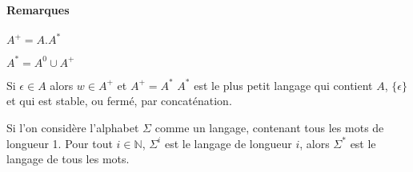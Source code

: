 \paragraph{Remarques} %
\label{par:remarques}

$A^+ = A.A^*$

$A^* = A^0 \cup A^+$

Si $\epsilon \in A$ alors $w \in A^+$ et $A^+ = A^*$
$A^*$ est le plus petit langage qui contient $A$, $\{\epsilon\}$ et qui est stable, ou fermé, par concaténation.

Si l'on considère l'alphabet $\Sigma$ comme un langage, contenant tous les mots de longueur 1. Pour tout $i \in \mathbb{N}$, $\Sigma^i$ est le langage de longueur $i$, alors $\Sigma^*$ est le langage de tous les mots.





